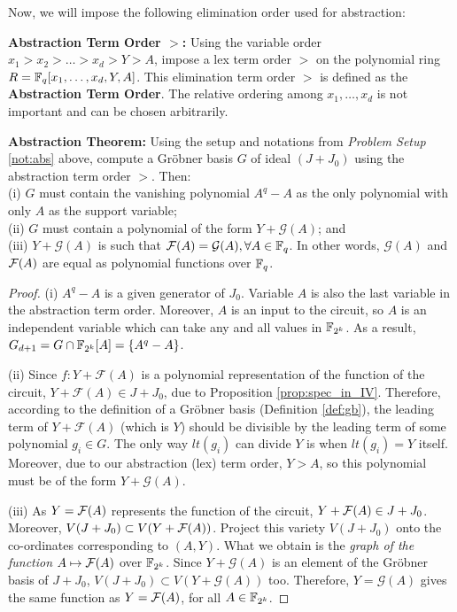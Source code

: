 Now, we will impose the following elimination order used for
abstraction: 

\begin{Definition}
{\bf Abstraction Term Order $>$:} 
Using the variable order $x_1 > x_2 > \dots > x_d > Y > A$,
impose a lex term order $>$ on the polynomial ring $R = {\mathbb{F}}_{q}[x_1,
  \dots, x_d, Y, A]$. This elimination term order $>$ is defined as
the {\bf Abstraction Term Order}. The relative ordering among $x_1,
\dots, x_d$ is not important and can be chosen arbitrarily. 
\end{Definition}


\begin{Theorem} \label{thm:abs}
{\bf Abstraction Theorem:} Using the setup and notations from {\it
  Problem Setup} \ref{not:abs} above, compute a Gr\"obner basis $G$ of
ideal $(J + J_0)$ using the abstraction term order $>$. Then: \\
(i) $G$ must contain the vanishing polynomial $A^q - A$ as the only
polynomial with only $A$ as the support variable;\\
(ii) $G$ must contain a polynomial of the form $Y + {\mathcal{G}}(A)$;
and\\ 
(iii) $Y + {\mathcal{G}}(A)$ is such that ${\mathcal{F}}(A) = {\mathcal{G}}(A),
\forall A \in {\mathbb{F}}_{q}$. In other words, ${\mathcal{G}}(A)$ and ${\mathcal{F}}(A)$ are
equal as polynomial functions over ${\mathbb{F}}_{q}$.
\end{Theorem}

\begin{proof}
(i) $A^q -A$ is a given generator of $J_0$. Variable $A$ is also the
  last variable in the abstraction term order. Moreover, $A$ is an
  input to the circuit, so $A$ is an independent variable which can
  take any and all values in ${\mathbb{F}}_{2^k}$. As a   result, $G_{d+1} = G \cap
  {\mathbb{F}}_{2^k}[A] = \{A^q - A\}$.

(ii) Since $f:Y + {\mathcal{F}}(A)$ is a polynomial representation of
  the function of the circuit, $Y + {\mathcal{F}}(A) \in J + J_0$, due
  to Proposition \ref{prop:spec_in_IV}. Therefore, according to the
  definition of a Gr\"obner basis (Definition \ref{def:gb}), the
  leading term of $Y + {\mathcal{F}}(A)$ (which is $Y$) should be
  divisible by the leading term of some polynomial $g_i \in G$. The
  only way $lt(g_i)$ can divide $Y$ is when $lt(g_i) = Y$
  itself. Moreover, due to our abstraction (lex) term order, $Y > A$,
  so this polynomial must be of the form $Y + {\mathcal{G}}(A)$. 

(iii) As $Y = {\mathcal{F}}(A)$ represents the function of the circuit, $Y +
  {\mathcal{F}}(A) \in J + J_0$. Moreover, $V(J + J_0) \subset V(Y + {\mathcal{F}}(A))$. 
  Project this variety $V(J + J_0)$ onto the co-ordinates
  corresponding to $(A, Y)$. What we obtain is the {\it graph of the
  function} $A \mapsto {\mathcal{F}}(A)$ over ${\mathbb{F}}_{2^k}$. Since $Y
  + {\mathcal{G}}(A)$ is an element of the Gr\"obner basis of $J +
  J_0$, $V(J + J_0) \subset V(Y + {\mathcal{G}}(A))$ too. Therefore,
  $Y = {\mathcal{G}}(A)$ gives the same function as $Y = {\mathcal{F}}(A)$, for
  all $A \in {\mathbb{F}}_{2^k}$.
\end{proof}

